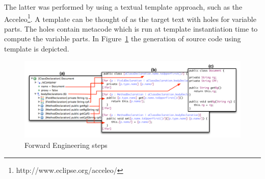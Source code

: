 The latter was performed by using a textual template approach, such as the Acceleo\footnote{http://www.eclipse.org/acceleo/}. A template can be thought of as the target text with holes for variable parts. The holes contain metacode which is run at template instantiation time to compute the variable parts. In Figure~\ref{fig:forward_Engineering} the generation of source code using template is depicted.

\begin{figure}[!ht]
\centering
  \includegraphics[scale=0.48]{figure/Forward_Engineering2}
\caption{Forward Engineering steps}
\label{fig:forward_Engineering}
\end{figure}